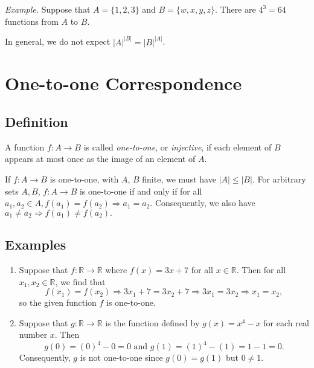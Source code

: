 \documentclass[11pt]{article}
\begin{document}
    \vspace{1em}

    \emph{Example.} Suppose that \(A = \{1,2,3\}\) and \(B = \{w,x,y,z\}\). There are \(4^3 = 64\) functions from $A$ to $B$.

    \vspace{1em}

    In general, we do not expect \(|A|^{|B|} = |B|^{|A|}\).

    \pagebreak

    \section{One-to-one Correspondence}

    \subsection{Definition}

    A function \(f:A \rightarrow B\) is called \emph{one-to-one}, or \emph{injective}, if each element of $B$ appears at most once as the image of an element of $A$. 
    
    \vspace{1em}

    If \(f: A \rightarrow B\) is one-to-one, with $A$, $B$ finite, we must have \(|A| \leq |B|\). For arbitrary sets \(A,B\), \(f: A \rightarrow B\) is one-to-one if and only if for all \(a_1, a_2 \in A, f(a_1) = f(a_2) \Rightarrow a_1 = a_2.\) Consequently, we also have \(a_1 \neq a_2 \Rightarrow f(a_1) \neq f(a_2).\)

    \subsection{Examples}

    \begin{enumerate}
        \item Suppose that \(f: \mathbb{R} \rightarrow \mathbb{R}\) where \(f(x) = 3x + 7\) for all \(x \in \mathbb{R}\). Then for all \(x_1,x_2 \in \mathbb{R}\), we find that \[f(x_1) = f(x_2) \Rightarrow 3x_1 + 7 = 3x_2 + 7 \Rightarrow 3x_1 = 3x_2 \Rightarrow x_1 = x_2,\] so the given function $f$ is one-to-one.
        \item Suppose that \(g: \mathbb{R} \rightarrow \mathbb{R}\) is the function defined by \(g(x) = x^4 - x\) for each real number $x$. Then \[g(0) = (0)^4 - 0 = 0 \text{ and } g(1) = (1)^4 - (1) = 1 - 1 = 0.\] Consequently, $g$ is not one-to-one since \(g(0) = g(1)\) but \(0 \neq 1.\)
    \end{enumerate}
\end{document}
